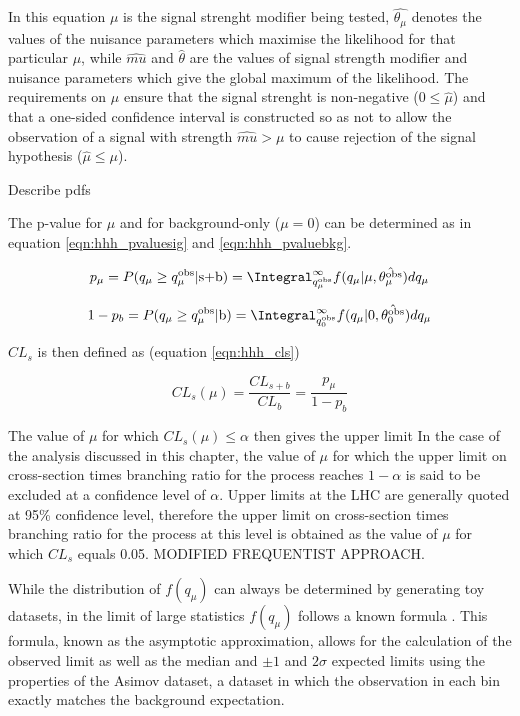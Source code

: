 In this equation $\mu$ is the signal strenght modifier being tested, $\hat{\theta_{\mu}}$ denotes the values of the
nuisance parameters which maximise the likelihood for that particular $\mu$, while $\hat{mu}$ and $\hat{\theta}$ are
the values of signal strength modifier and nuisance parameters which give the global maximum of the likelihood.
The requirements on $\mu$ ensure that the signal strenght is non-negative ($ 0 \leq \hat{\mu}$) and that
a one-sided confidence interval is constructed so as not to allow the observation of  a 
signal with strength $\hat{mu} > \mu$ to cause rejection of the signal hypothesis ($ \hat{\mu} \leq \mu$).

Describe pdfs

The p-value for $\mu$ and for background-only ($\mu = 0$) can be determined as in equation \ref{eqn:hhh_pvaluesig} and \ref{eqn:hhh_pvaluebkg}.

\begin{equation}\label{eqn:hhh_pvaluesig}
p_{\mu} = P(q_{\mu} \geq q_{\mu}^{\text{obs}} | \text{s+b}) = \Integral_{q_{\mu}^{\text{obs}}}^{\infty} f(q_{\mu} | \mu,\hat{\theta_{\mu}^{\text{obs}}}) dq_{\mu}
\end{equation}

\begin{equation}\label{eqn:hhh_pvaluebkg}
1-p_b = P(q_{\mu} \geq q_{\mu}^{\text{obs}} | \text{b}) = \Integral_{q_{0}^{\text{obs}}}^{\infty} f(q_{\mu} | 0,\hat{\theta_{0}^{\text{obs}}}) dq_{\mu} 
\end{equation}

$CL_s$ is then defined as (equation \ref{eqn:hhh_cls})

\begin{equation}\label{eqn:hhh_cls}
CL_s(\mu) = \frac{CL_{s+b}}{CL_b} = \frac{p_{\mu}}{1-p_b}
\end{equation}

The value of $\mu$ for which $CL_s(\mu) \leq \alpha$ then gives the upper limit 
In the case of the analysis discussed in this chapter, the value of $\mu$ for which the upper 
limit on cross-section times branching ratio for the \Htohhtobbtautau process reaches $1-\alpha$ is 
said to be excluded at a confidence level of $\alpha$. Upper limits at the LHC are generally
quoted at 95\% confidence level, therefore the upper limit on cross-section times branching ratio
for the \Htohhtobbtautau process at this level is obtained as the value of $\mu$ for which $CL_s$ 
equals 0.05. MODIFIED FREQUENTIST APPROACH.

While the distribution of $f(q_{\mu})$ can always be determined by generating toy datasets,
in the limit of large statistics $f(q_{\mu})$ follows a known formula \cite{AsymptoticFormula}.
This formula, known as the asymptotic approximation, allows for the calculation
of the observed limit as well as the median and $\pm 1$ and $2\sigma$ expected limits using
the properties of the Asimov dataset, a dataset in which the observation in 
each bin exactly matches the background expectation.



